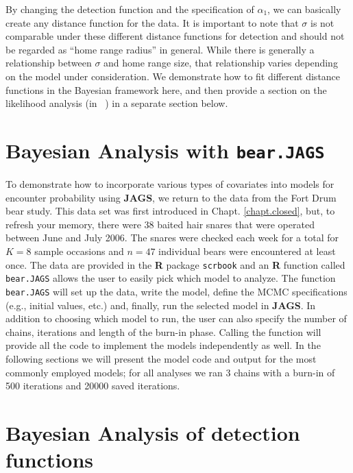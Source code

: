 \begin{table}[ht]
\begin{tabular}{cccl}
\end{tabular}
\label{covariates.tab.detmodels}
\end{table}

By changing the detection function and the specification of
$\alpha_1$, we can basically create any distance function for the
data. It is important to note that $\sigma$ is not comparable under
these different distance functions for detection and should not be
regarded as ``home range radius'' in general.  While there is
generally a relationship between $\sigma$ and home range size, that
relationship varies depending on the model under consideration. We
demonstrate how to fit different distance functions in the Bayesian
framework here, and then provide a section on the likelihood analysis
(in \secr~) in a separate section below.

\section{Bayesian Analysis with {\tt bear.JAGS}}

To demonstrate how to incorporate various types of covariates into
models for encounter probability using {\bf JAGS}, we return to the
data from the Fort Drum bear study.  This data set was first
introduced in Chapt. \ref{chapt.closed}, but, to refresh your memory,
there were 38 baited hair snares that were operated between June and
July 2006.  The snares were checked each week for a total for $K=8$
sample occasions and $n=47$ individual bears were encountered at least
once.  The data are provided in the {\bf R} package \mbox{\tt scrbook}
and an {\bf R} function called {\tt bear.JAGS} allows the user to
easily pick which model to analyze.  The function {\tt bear.JAGS} will
set up the data, write the model, define the MCMC specifications
(e.g., initial values, etc.) and, finally, run the selected model in
{\bf JAGS}. In addition to choosing which model to run, the user can
also specify the number of chains, iterations and length of the
burn-in phase. Calling the function will provide all the code to
implement the models independently as well.  In the following sections
we will present the model code and output for the most commonly
employed models; for all analyses we ran 3 chains with a burn-in of
500 iterations and 20000 saved iterations.

\section{Bayesian Analysis of detection functions}

